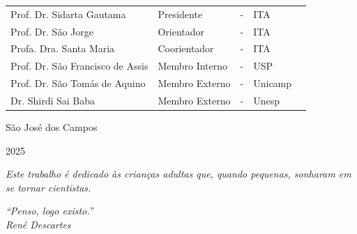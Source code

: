 \documentclass[
  12pt,
  oneside,
  a4paper,
  english,
  brazil]{abntex2}
\begin{document}
\begin{center}

\begin{tabular}{>{\raggedright\arraybackslash}p{6cm} >{\raggedright\arraybackslash}p{4cm} >{\raggedright\arraybackslash}p{3cm} >{\raggedright\arraybackslash}p{1cm} >{\raggedright\arraybackslash}p{3cm}}
 Prof. Dr. Sidarta Gautama    & Presidente     & - & ITA \\
 Prof. Dr. São Jorge    & Orientador     & - & ITA \\
 Profa. Dra. Santa Maria  & Coorientador   & - & ITA \\
 Prof. Dr. São Francisco de Assis       & Membro Interno & - & USP \\
 Prof. Dr. São Tomás de Aquino     & Membro Externo & - & Unicamp \\
 Dr. Shirdi Sai Baba     & Membro Externo & - & Unesp \\
\end{tabular}

\end{center}

\begin{center}

\vspace*{2.5cm}

{\large São José dos Campos}
\par
{\large 2025}

\end{center}

\newpage{}

\vspace*{\fill}

\hfill
\begin{minipage}{0.5\textwidth}
    \begin{flushright}
        \textit{ Este trabalho é dedicado às crianças adultas que, quando pequenas, sonharam em se tornar cientistas. }
    \end{flushright}
\end{minipage}

\vspace{2cm}

\newpage{}

\vspace*{\fill}

\hfill
\begin{minipage}{0.5\textwidth}
    \begin{flushright}
        \textit{ “Penso, logo existo.” } \\
        \textit{ René Descartes }
    \end{flushright}
\end{minipage}
\end{document}
